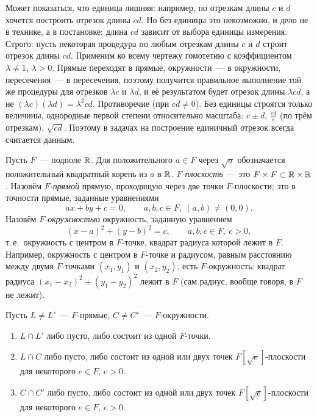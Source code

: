 \begin{aside}
Может показаться, что единица лишняя: например, по отрезкам длины $c$ и $d$ хочется построить отрезок длины $cd$. Но без
единицы это невозможно, и дело не в технике, а в постановке: длина $cd$ зависит от выбора единицы измерения. Строго:
пусть некоторая процедура по любым отрезкам длины $c$ и $d$ строит отрезок длины $cd$. Применим ко всему чертежу
гомотетию с коэффициентом $\lambda\ne1$, $\lambda>0$. Прямые переходят в прямые, окружности~--- в окружности, пересечения~---
в пересечения, поэтому получится правильное выполнение той же процедуры для отрезков $\lambda c$ и $\lambda d$, и её
результатом будет отрезок длины $\lambda cd$, а не $(\lambda c)(\lambda d)=\lambda^2cd$. Противоречие (при $cd\ne0$). Без единицы
строятся только величины, однородные первой степени относительно масштаба: $c\pm d$, $\frac{cd}e$ (по трём отрезкам),
$\sqrt{cd}$. Поэтому в задачах на построение единичный отрезок всегда считается данным.
\end{aside}

Пусть $F$~--- подполе $\mathbb R$. Для положительного $a\in F$ через $\sqrt a$ обозначается положительный квадратный корень из $a$
в $\mathbb R$. \emph{$F$-плоскость}~--- это $F\times F\subset\mathbb R\times\mathbb R$. Назовём \emph{$F$-прямой} прямую, проходящую через две точки
$F$-плоскости; это в точности прямые, заданные уравнениями
\[
ax+by+c=0,\qquad a,b,c\in F,\ (a,b)\ne(0,0).
\]
Назовём \emph{$F$-окружностью} окружность, заданную уравнением
\[
(x-a)^2+(y-b)^2=c,\qquad a,b,c\in F,\ c>0,
\]
т.\,е.\ окружность с центром в $F$-точке, квадрат радиуса которой лежит в $F$. Например, окружность с центром в
$F$-точке и радиусом, равным расстоянию между двумя $F$-точками $(x_1,y_1)$ и $(x_2,y_2)$, есть $F$-окружность:
квадрат радиуса $(x_1-x_2)^2+(y_1-y_2)^2$ лежит в $F$ (сам радиус, вообще говоря, в $F$ не лежит).

\begin{lemma}[1.35]
Пусть $L\ne L'$~--- $F$-прямые, $C\ne C'$~--- $F$-окружности.
\begin{enumerate}[label=(\alph*)]
\item $L\cap L'$ либо пусто, либо состоит из одной $F$-точки.
\item $L\cap C$ либо пусто, либо состоит из одной или двух точек $F[\sqrt e]$-плоскости для некоторого $e\in F$, $e>0$.
\item $C\cap C'$ либо пусто, либо состоит из одной или двух точек $F[\sqrt e]$-плоскости для некоторого $e\in F$, $e>0$.
\end{enumerate}
\end{lemma}

